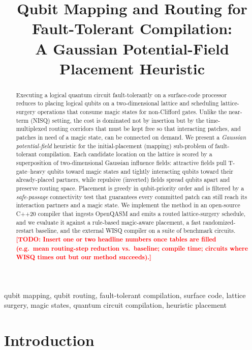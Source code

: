 \documentclass[10pt,conference]{IEEEtran}
\title{%
    Qubit Mapping and Routing for Fault-Tolerant Compilation:\\
    \large A Gaussian Potential-Field Placement Heuristic%
}
\author{%
    \IEEEauthorblockN{%
        Alessandro Ruzza\IEEEauthorrefmark{1},
        Federico Quartieri\IEEEauthorrefmark{1},
        Daniele Salvi\IEEEauthorrefmark{1}
    }
    \IEEEauthorblockA{
        \IEEEauthorrefmark{1}
        Politecnico di Milano, Milan, Italy\\
        \texttt{\{alessandro.ruzza, federico.quartieri, daniele.salvi\}@polimi.it}
    }
}
\theoremstyle{definition}
\theoremstyle{remark}
\newcommand{\SWAP}{\mathrm{SWAP}}
\newcommand{\todo}[1]{\textcolor{red}{\textbf{[TODO: #1]}}}
\begin{document}
\maketitle

\begin{abstract}
Executing a logical quantum circuit fault-tolerantly on a surface-code
processor reduces to placing logical qubits on a two-dimensional lattice and
scheduling lattice-surgery operations that consume magic states for
non-Clifford gates. Unlike the near-term (NISQ) setting, the cost is dominated
not by \SWAP{} insertion but by the time-multiplexed routing corridors that
must be kept free so that interacting patches, and patches in need of a magic
state, can be connected on demand. We present a \emph{Gaussian potential-field}
heuristic for the initial-placement (mapping) sub-problem of fault-tolerant
compilation. Each candidate location on the lattice is scored by a
superposition of two-dimensional Gaussian influence fields: attractive fields
pull T-gate--heavy qubits toward magic states and tightly interacting qubits
toward their already-placed partners, while repulsive (inverted) fields spread
qubits apart and preserve routing space. Placement is greedy in qubit-priority
order and is filtered by a \emph{safe-passage} connectivity test that
guarantees every committed patch can still reach its interaction partners and a
magic state. We implement the method in an open-source C++20 compiler that
ingests OpenQASM and emits a routed lattice-surgery schedule, and we evaluate it
against a rule-based magic-aware placement, a fast randomized-restart baseline,
and the external WISQ compiler on a suite of benchmark circuits.
\todo{Insert one or two headline numbers once tables are filled (e.g.\ mean
routing-step reduction vs.\ baseline; compile time; circuits where WISQ
times out but our method succeeds).}
\end{abstract}

\begin{IEEEkeywords}
qubit mapping, qubit routing, fault-tolerant compilation, surface code,
lattice surgery, magic states, quantum circuit compilation, heuristic placement
\end{IEEEkeywords}

\section{Introduction}
\label{sec:intro}
\end{document}

